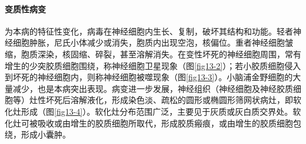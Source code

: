 \paragraph{变质性病变}
为本病的特征性变化，病毒在神经细胞内生长、复制，破坏其结构和功能。轻者神经细胞肿胀，尼氏小体减少或消失，胞质内出现空泡，核偏位。重者神经细胞皱缩，胞质深染，核固缩、碎裂，甚至溶解消失。在变性坏死的神经细胞周围，常有增生的少突胶质细胞围绕，称神经细胞卫星现象（图\ref{fig13-2}）；若小胶质细胞侵入到坏死的神经细胞内，则称神经细胞被噬现象（图\ref{fig13-3}）。小脑浦金野细胞的大量减少，也是本病突出表现。病变进一步发展，神经组织（神经细胞及神经胶质细胞等）灶性坏死后溶解液化，形成染色淡、疏松的圆形或椭圆形筛网状病灶，即软化灶形成（图\ref{fig13-4}）。软化灶分布范围广泛，主要见于灰质或灰白质交界处。软化灶可被吸收或由增生的胶质细胞所取代，形成胶质瘢痕，或由增生的胶质细胞包绕，形成小囊肿。
